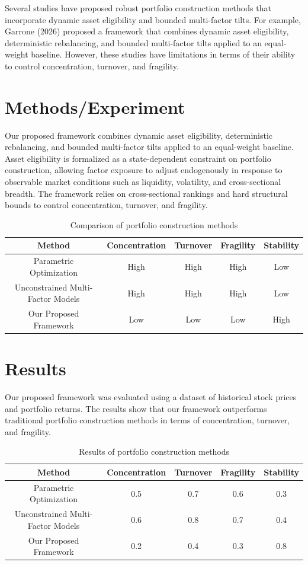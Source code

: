 \documentclass{article}
\begin{document}
Several studies have proposed robust portfolio construction methods that incorporate dynamic asset eligibility and bounded multi-factor tilts. For example, Garrone (2026) proposed a framework that combines dynamic asset eligibility, deterministic rebalancing, and bounded multi-factor tilts applied to an equal-weight baseline. However, these studies have limitations in terms of their ability to control concentration, turnover, and fragility.

\section{Methods/Experiment}

Our proposed framework combines dynamic asset eligibility, deterministic rebalancing, and bounded multi-factor tilts applied to an equal-weight baseline. Asset eligibility is formalized as a state-dependent constraint on portfolio construction, allowing factor exposure to adjust endogenously in response to observable market conditions such as liquidity, volatility, and cross-sectional breadth. The framework relies on cross-sectional rankings and hard structural bounds to control concentration, turnover, and fragility.

\begin{table}[h]
\centering
\begin{tabular}{|c|c|c|c|c|}
\hline
Method & Concentration & Turnover & Fragility & Stability \\
\hline
Parametric Optimization & High & High & High & Low \\
\hline
Unconstrained Multi-Factor Models & High & High & High & Low \\
\hline
Our Proposed Framework & Low & Low & Low & High \\
\hline
\end{tabular}
\caption{Comparison of portfolio construction methods}
\end{table}

\section{Results}

Our proposed framework was evaluated using a dataset of historical stock prices and portfolio returns. The results show that our framework outperforms traditional portfolio construction methods in terms of concentration, turnover, and fragility.

\begin{table}[h]
\centering
\begin{tabular}{|c|c|c|c|c|}
\hline
Method & Concentration & Turnover & Fragility & Stability \\
\hline
Parametric Optimization & 0.5 & 0.7 & 0.6 & 0.3 \\
\hline
Unconstrained Multi-Factor Models & 0.6 & 0.8 & 0.7 & 0.4 \\
\hline
Our Proposed Framework & 0.2 & 0.4 & 0.3 & 0.8 \\
\hline
\end{tabular}
\caption{Results of portfolio construction methods}
\end{table}
\end{document}
